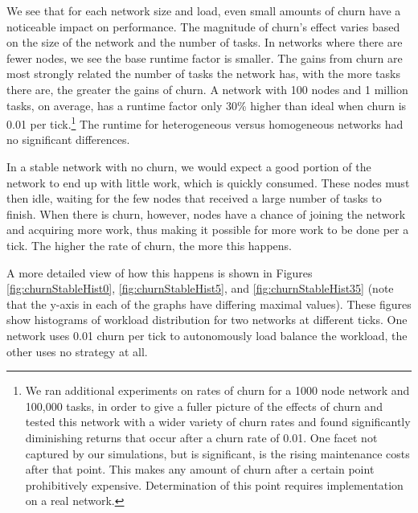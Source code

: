 \documentclass[10pt,conference]{IEEEtran}
\begin{document}
	We see that for each network size and load, even small amounts of churn have a noticeable impact on performance.
	The magnitude of churn's effect varies based on the size of the network and the number of tasks.
	In networks where there are fewer nodes, we see the base runtime factor is smaller.
	The gains from churn are most strongly related the number of tasks the network has, with the more tasks there are, the greater the gains of churn.
	A network with 100 nodes and 1 million tasks, on average, has a runtime factor only 30\% higher than ideal when churn is 0.01 per tick.\footnote{We ran additional experiments on rates of churn for a 1000 node network and 100,000 tasks, in order to give a fuller picture of the effects of churn and tested this network with a wider variety of churn rates and found significantly diminishing returns that occur after a churn rate of 0.01.
		One facet not captured by our simulations, but is significant, is the rising maintenance costs after that point.
		This makes any amount of churn after a certain point prohibitively expensive.
		Determination of this point requires implementation on a real network.}
	The runtime for heterogeneous versus homogeneous networks had no significant differences.
	
	

	
	

	

	In a stable network with no churn, we would expect a good portion of the network to end up with little work, which is quickly consumed.
	These nodes must then idle, waiting for the few nodes that received a large number of tasks to finish.
	When there is churn, however, nodes have a chance of joining the network and acquiring more work, thus making it possible for more work to be done per a tick.
	The higher the rate of churn, the more this happens.
	
%	
	
	
	A more detailed view of how this happens is shown in Figures \ref{fig:churnStableHist0}, \ref{fig:churnStableHist5}, and \ref{fig:churnStableHist35} (note that the y-axis in each of the graphs have differing maximal values).
	These figures show histograms of workload distribution for two networks at different ticks.
	One network uses 0.01 churn per tick to autonomously load balance the workload, the other uses no strategy at all.
	
\end{document}
